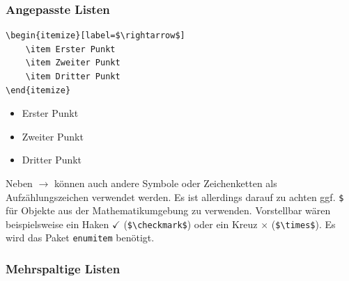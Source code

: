 \subsubsection{Angepasste Listen}

\begin{minipage}{0.58\textwidth}
    \begin{lstlisting}[language={[LaTeX]TeX}]
\begin{itemize}[label=$\rightarrow$]
    \item Erster Punkt
    \item Zweiter Punkt
    \item Dritter Punkt
\end{itemize}
\end{lstlisting}
\end{minipage}
\hfill
\begin{minipage}{0.35\textwidth}
    \begin{itemize}[label=$\rightarrow$]
        \item Erster Punkt
        \item Zweiter Punkt
        \item Dritter Punkt
    \end{itemize}
\end{minipage}

Neben $\rightarrow$ können auch andere Symbole oder Zeichenketten als Aufzählungszeichen verwendet werden. Es ist allerdings darauf zu achten ggf. \texttt{\$} für Objekte aus der Mathematikumgebung zu verwenden. Vorstellbar wären beispielsweise ein Haken $\checkmark$ (\texttt{\$\textbackslash checkmark\$}) oder ein Kreuz $\times$ (\texttt{\$\textbackslash times\$}). Es wird das Paket \texttt{enumitem} benötigt.

\subsubsection{Mehrspaltige Listen}

